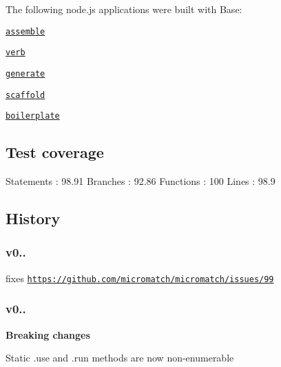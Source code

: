 The following node.\+js applications were built with {\ttfamily Base}\+:


\begin{DoxyItemize}
\item \href{https://github.com/assemble/assemble}{\tt assemble}
\item \href{https://github.com/verbose/verb}{\tt verb}
\item \href{https://github.com/generate/generate}{\tt generate}
\item \href{https://github.com/jonschlinkert/scaffold}{\tt scaffold}
\item \href{https://github.com/jonschlinkert/boilerplate}{\tt boilerplate}
\end{DoxyItemize}

\subsection*{Test coverage}


\begin{DoxyCode}
Statements   : 98.91%
Branches     : 92.86%
Functions    : 100%
Lines        : 98.9%
\end{DoxyCode}


\subsection*{History}

\subsubsection*{v0..}


\begin{DoxyItemize}
\item fixes \href{https://github.com/micromatch/micromatch/issues/99}{\tt https\+://github.\+com/micromatch/micromatch/issues/99}
\end{DoxyItemize}

\subsubsection*{v0..}

{\bfseries Breaking changes}


\begin{DoxyItemize}
\item Static {\ttfamily .use} and {\ttfamily .run} methods are now non-\/enumerable
\end{DoxyItemize}

